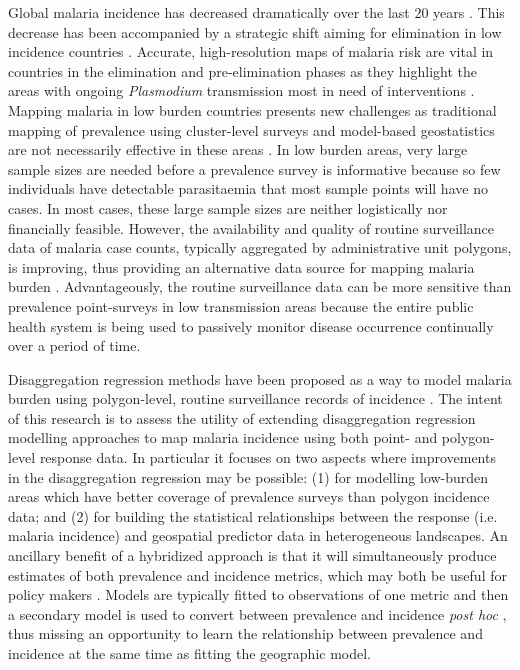 \documentclass{statsoc}
\begin{document}
Global malaria incidence has decreased dramatically over the last 20 years \citep{bhatt2015effect, weiss2019mapping, battle2019mapping}.
This decrease has been accompanied by a strategic shift aiming for elimination in low incidence countries \citep{world2016world, newby2016path}.
Accurate, high-resolution maps of malaria risk are vital in countries in the elimination and pre-elimination phases as they highlight the areas with ongoing \emph{Plasmodium} transmission most in need of interventions \citep{sturrock2016mapping, cohen2017mapping}.
Mapping malaria in low burden countries presents new challenges as traditional mapping of prevalence \citep{gething2011new, bhatt2017improved, gething2012long, bhatt2015effect} using cluster-level surveys and model-based geostatistics are not necessarily effective in these areas \citep{sturrock2016mapping, sturrock2014fine}.
In low burden areas, very large sample sizes are needed before a prevalence survey is informative because so few individuals have detectable parasitaemia that most sample points will have no cases.
In most cases, these large sample sizes are neither logistically nor financially feasible.
However, the availability and quality of routine surveillance data of malaria case counts, typically aggregated by administrative unit polygons, is improving, thus providing an alternative data source for mapping malaria burden \citep{sturrock2016mapping, ohrt2015information, cibulskis2011worldwide}.
Advantageously, the routine surveillance data can be more sensitive than prevalence point-surveys in low transmission areas because the entire public health system is being used to passively monitor disease occurrence continually over a period of time\citep{cibulskis2011worldwide}.

Disaggregation regression methods have been proposed as a way to model malaria burden using polygon-level, routine surveillance records of incidence \citep{sturrock2014fine, wilson2017pointless, law2018variational, taylor2017continuous, li2012log}.
The intent of this research is to assess the utility of extending disaggregation regression modelling approaches to map malaria incidence using both point- and polygon-level response data. 
In particular it focuses on two aspects where improvements in the disaggregation regression may be possible:
(1) for modelling low-burden areas which have better coverage of prevalence surveys than polygon incidence data; and
(2) for building the statistical relationships between the response (i.e. malaria incidence) and geospatial predictor data in heterogeneous landscapes. 
An ancillary benefit of a hybridized approach is that it will simultaneously produce estimates of both prevalence and incidence metrics, which may both be useful for policy makers \citep{cohen2017mapping}.
Models are typically fitted to observations of one metric and then a secondary model is used to convert between prevalence and incidence \emph{post hoc} \citep{battle2019mapping, bhatt2015effect}, thus missing an opportunity to learn the relationship between prevalence and incidence at the same time as fitting the geographic model. 
\end{document}
